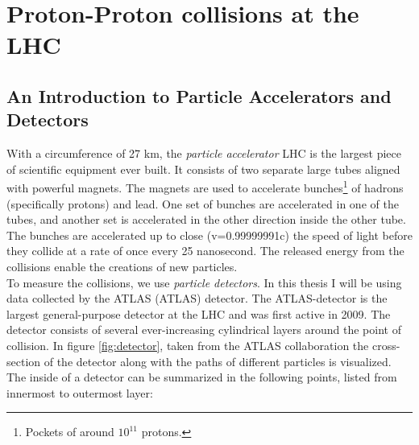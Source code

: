 \section{Proton-Proton collisions at the LHC}
\subsection{An Introduction to Particle Accelerators and Detectors}\label{subsec:Detector}
With a circumference of 27 km, the \emph{particle accelerator} \ac{LHC} is the largest piece of scientific 
equipment ever built. It consists of two separate large tubes aligned with powerful magnets. The magnets are used 
to accelerate bunches\footnote{Pockets of around $10^{11}$ protons.} of hadrons (specifically protons) and lead. One set 
of bunches are accelerated in one of the tubes, and another set is accelerated in the other direction inside the 
other tube. The bunches are accelerated up to close (v=0.99999991c) the speed of light before they collide at a 
rate of once every 25 nanosecond. The released energy from the collisions enable the creations of new particles.
\\
To measure the collisions, we use \emph{particle detectors}. In this thesis I will be using data collected by the 
\acs{ATLAS} (\acl{ATLAS}) detector. The \ac{ATLAS}-detector is the largest general-purpose detector at the \ac{LHC}
and was first active in 2009. The detector consists of several ever-increasing cylindrical layers around the point of 
collision. In figure \ref{fig:detector}, taken from the \ac{ATLAS} collaboration \cite{PDetector} the cross-section 
of the detector along with the paths of different particles is visualized. The inside of a detector can be summarized 
in the following points, listed from innermost to outermost layer:
